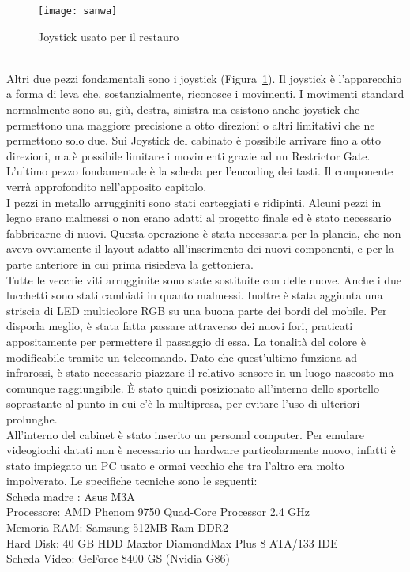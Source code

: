 \begin{figure}[!ht]
\texttt{[image: sanwa]}
\centering
\caption{Joystick usato per il restauro}
\label{fig:sanwa}
\end{figure}
\\Altri due pezzi fondamentali sono i joystick (Figura~\ref{fig:sanwa}). Il joystick è l’apparecchio a forma di leva che, sostanzialmente, riconosce i movimenti. I movimenti standard normalmente sono su, giù, destra, sinistra ma esistono anche joystick che permettono una maggiore precisione a otto direzioni o altri limitativi che ne permettono solo due. Sui Joystick del cabinato è possibile arrivare fino a otto direzioni, ma è possibile limitare i movimenti grazie ad un Restrictor Gate.\\
L’ultimo pezzo fondamentale è la scheda per l’encoding dei tasti. Il componente verrà approfondito nell’apposito capitolo.\\I pezzi in metallo arrugginiti sono stati carteggiati e ridipinti. Alcuni pezzi in legno erano malmessi o non erano adatti al progetto finale ed è stato necessario fabbricarne di nuovi. Questa operazione è stata necessaria per la plancia, che non aveva ovviamente il layout adatto all’inserimento dei nuovi componenti, e per la parte anteriore in cui prima risiedeva la gettoniera.\\Tutte le vecchie viti arrugginite sono state sostituite con delle nuove. Anche i due lucchetti sono stati cambiati in quanto malmessi. Inoltre è stata aggiunta una striscia di LED multicolore RGB su una buona parte dei bordi del mobile. Per disporla meglio, è stata fatta passare attraverso dei nuovi fori, praticati appositamente per permettere il passaggio di essa. La tonalità del colore è modificabile tramite un telecomando. Dato che quest’ultimo funziona ad infrarossi, è stato necessario piazzare il relativo sensore in un luogo nascosto ma comunque raggiungibile. È stato quindi posizionato all’interno dello sportello soprastante al punto in cui c'è la multipresa, per evitare l’uso di ulteriori prolunghe.\\All’interno del cabinet è stato inserito un personal computer. Per emulare videogiochi datati non è necessario un hardware particolarmente nuovo, infatti è stato impiegato un PC usato e ormai vecchio che tra l’altro era molto impolverato. Le specifiche tecniche sono le seguenti:\\
Scheda madre : Asus M3A\\
Processore: AMD Phenom 9750 Quad-Core Processor 2.4 GHz\\
Memoria RAM: Samsung 512MB Ram DDR2\\
Hard Disk: 40 GB HDD Maxtor DiamondMax Plus 8 ATA/133 IDE\\
Scheda Video: GeForce 8400 GS (Nvidia G86)
